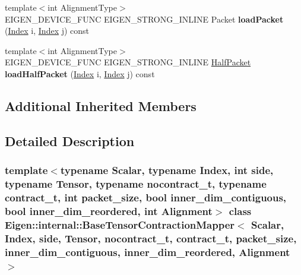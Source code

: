 \begin{DoxyCompactItemize}
\item 
\mbox{\label{class_eigen_1_1internal_1_1_base_tensor_contraction_mapper_ae5029de464b3b11235e822404e81a464}} 
{\footnotesize template$<$int Alignment\+Type$>$ }\\E\+I\+G\+E\+N\+\_\+\+D\+E\+V\+I\+C\+E\+\_\+\+F\+U\+NC E\+I\+G\+E\+N\+\_\+\+S\+T\+R\+O\+N\+G\+\_\+\+I\+N\+L\+I\+NE Packet {\bfseries load\+Packet} (\hyperlink{namespace_eigen_a62e77e0933482dafde8fe197d9a2cfde}{Index} i, \hyperlink{namespace_eigen_a62e77e0933482dafde8fe197d9a2cfde}{Index} j) const
\item 
\mbox{\label{class_eigen_1_1internal_1_1_base_tensor_contraction_mapper_aeb8735af5f4ed04f6001addde8fae7ef}} 
{\footnotesize template$<$int Alignment\+Type$>$ }\\E\+I\+G\+E\+N\+\_\+\+D\+E\+V\+I\+C\+E\+\_\+\+F\+U\+NC E\+I\+G\+E\+N\+\_\+\+S\+T\+R\+O\+N\+G\+\_\+\+I\+N\+L\+I\+NE \hyperlink{union_eigen_1_1internal_1_1_packet}{Half\+Packet} {\bfseries load\+Half\+Packet} (\hyperlink{namespace_eigen_a62e77e0933482dafde8fe197d9a2cfde}{Index} i, \hyperlink{namespace_eigen_a62e77e0933482dafde8fe197d9a2cfde}{Index} j) const
\end{DoxyCompactItemize}
\subsection*{Additional Inherited Members}


\subsection{Detailed Description}
\subsubsection*{template$<$typename Scalar, typename Index, int side, typename Tensor, typename nocontract\+\_\+t, typename contract\+\_\+t, int packet\+\_\+size, bool inner\+\_\+dim\+\_\+contiguous, bool inner\+\_\+dim\+\_\+reordered, int Alignment$>$\newline
class Eigen\+::internal\+::\+Base\+Tensor\+Contraction\+Mapper$<$ Scalar, Index, side, Tensor, nocontract\+\_\+t, contract\+\_\+t, packet\+\_\+size, inner\+\_\+dim\+\_\+contiguous, inner\+\_\+dim\+\_\+reordered, Alignment $>$}



